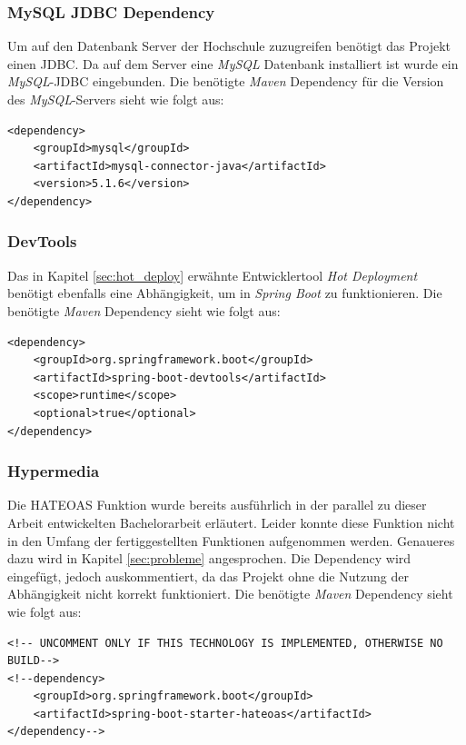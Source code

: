 \subsubsection*{MySQL \ac{JDBC} Dependency}
Um auf den Datenbank Server der Hochschule zuzugreifen benötigt das Projekt einen \ac{JDBC}. Da auf dem Server eine \textit{MySQL} Datenbank installiert ist wurde ein \textit{MySQL}-\ac{JDBC} eingebunden. Die benötigte \textit{Maven} Dependency für die Version des \textit{MySQL}-Servers sieht wie folgt aus:
\begin{lstlisting}[caption={\textit{MySQL} JDBC}]
<dependency>
    <groupId>mysql</groupId>
    <artifactId>mysql-connector-java</artifactId>
    <version>5.1.6</version>
</dependency>
\end{lstlisting}

\subsubsection*{DevTools}
Das in Kapitel \ref{sec:hot_deploy} erwähnte Entwicklertool \textit{Hot Deployment} benötigt ebenfalls eine Abhängigkeit, um in \textit{Spring Boot} zu funktionieren. Die benötigte \textit{Maven} Dependency sieht wie folgt aus:
\begin{lstlisting}[caption={\textit{Spring} DevTool Dependency}]
<dependency>
    <groupId>org.springframework.boot</groupId>
    <artifactId>spring-boot-devtools</artifactId>
    <scope>runtime</scope>
    <optional>true</optional>
</dependency>
\end{lstlisting}


\subsubsection*{Hypermedia}
Die \ac{HATEOAS} Funktion wurde bereits  ausführlich in der parallel zu dieser Arbeit entwickelten Bachelorarbeit erläutert\autocite[][]{dnba}. Leider konnte diese Funktion nicht in den Umfang der fertiggestellten Funktionen aufgenommen werden. Genaueres dazu wird in Kapitel \ref{sec:probleme} angesprochen. Die Dependency wird eingefügt, jedoch auskommentiert, da das Projekt ohne die Nutzung der Abhängigkeit nicht korrekt funktioniert. Die benötigte \textit{Maven} Dependency sieht wie folgt aus:
\begin{lstlisting}[caption={\ac{HATEOAS} Dependency},commentstyle=\color{red}]
<!-- UNCOMMENT ONLY IF THIS TECHNOLOGY IS IMPLEMENTED, OTHERWISE NO BUILD-->
<!--dependency>
    <groupId>org.springframework.boot</groupId>
    <artifactId>spring-boot-starter-hateoas</artifactId>
</dependency-->
\end{lstlisting}

